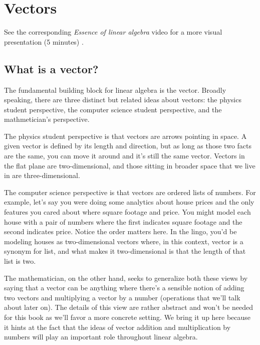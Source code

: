 \section{Vectors}

\begin{remark}
  See the corresponding \textit{Essence of linear algebra} video for a more
  visual presentation (5 minutes) \cite{bib:linalg_vectors}.
\end{remark}

\subsection{What is a vector?}

The fundamental building block for linear algebra is the vector. Broadly
speaking, there are three distinct but related ideas about vectors: the physics
student perspective, the computer science student perspective, and the
mathmetician's perspective.

The physics student perspective is that vectors are arrows pointing in space. A
given vector is defined by its length and direction, but as long as those two
facts are the same, you can move it around and it's still the same vector.
Vectors in the flat plane are two-dimensional, and those sitting in broader
space that we live in are three-dimensional.

The computer science perspective is that vectors are ordered lists of numbers.
For example, let's say you were doing some analytics about house prices and the
only features you cared about where square footage and price. You might model
each house with a pair of numbers where the first indicates square footage and
the second indicates price. Notice the order matters here. In the lingo, you'd
be modeling houses as two-dimensional vectors where, in this context, vector is
a synonym for list, and what makes it two-dimensional is that the length of that
list is two.

The mathematician, on the other hand, seeks to generalize both these views by
saying that a vector can be anything where there's a sensible notion of adding
two vectors and multiplying a vector by a number (operations that we'll talk
about later on). The details of this view are rather abstract and won't be
needed for this book as we'll favor a more concrete setting. We bring it up here
because it hints at the fact that the ideas of vector addition and
multiplication by numbers will play an important role throughout linear algebra.

